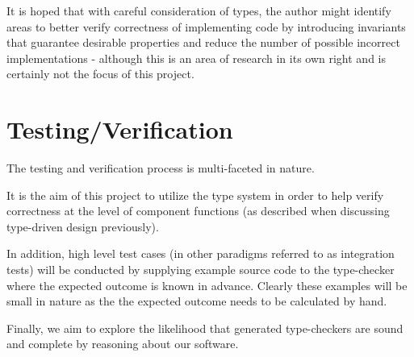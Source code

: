 \documentclass{ProgressReport}[2020/09/15]
\begin{document}
        It is hoped that with careful consideration of types, the
        author might identify areas to better verify correctness of
        implementing code by introducing invariants that guarantee desirable
        properties and reduce the number of possible incorrect
        implementations - although this is an area of research in its
        own right and is certainly not the focus of this project.
        
        \section{Testing/Verification}

        The testing and verification process is multi-faceted in
        nature.

        It is the aim of this project to utilize the type system in
        order to help verify correctness at the level of component
        functions (as described when discussing type-driven design
        previously).

        In addition, high level test cases (in other paradigms
        referred to as integration tests) will be conducted by
        supplying example source code to the type-checker where the
        expected outcome is known in advance. Clearly these examples
        will be small in nature as the the expected outcome needs to
        be calculated by hand.

        Finally, we aim to explore the likelihood that generated
        type-checkers are sound and complete by reasoning about our
        software. 
        	
	
	
	\clearpage
	\printbibliography
	\nocite{*} %
\end{document}

